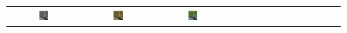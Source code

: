 \documentclass[10pt,twocolumn,letterpaper]{article}
\def\acollumsize{0.14\textwidth}
\begin{document}
\begin{figure}[t!]
\begin{center}
\begin{tabular}{ ccccccccccccc }
\includegraphics[width=\acollumsize]{img/result/16_in.JPEG}&
\includegraphics[width=\acollumsize]{img/result/16.png}&
\includegraphics[width=\acollumsize]{img/result/16_gt.JPEG}& &&


\end{tabular}
\end{center}
\end{figure}
\end{document}
